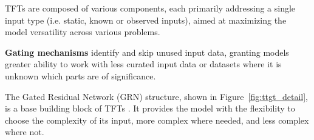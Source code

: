     
    \noindent TFTs are composed of various components, each primarily addressing a single input type (i.e. static, known or observed inputs), aimed at maximizing the model versatility across various problems.
    

    
    \noindent\textbf{Gating mechanisms} identify and skip unused input data, granting models greater ability to work with less curated input data or datasets where it is unknown which parts are of significance.
    
    The Gated Residual Network (GRN) structure, shown in Figure~\ref{fig:ttgt_detail}, is a base building block of TFTs \cite{lim_temporal_2020}. It provides the model with the flexibility to choose the complexity of its input, more complex where needed, and less complex where not.
    
